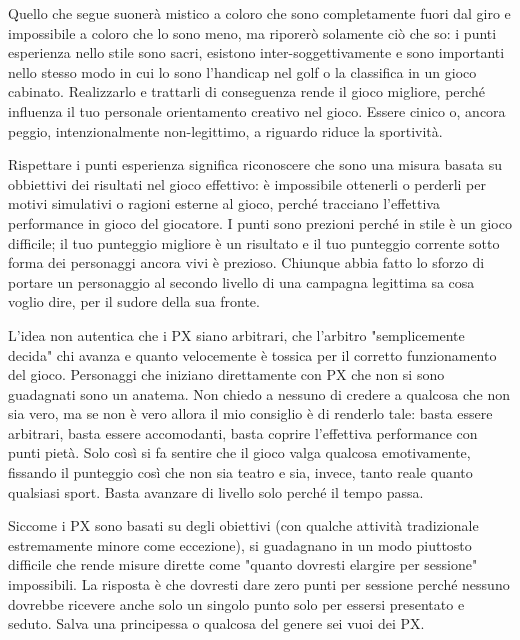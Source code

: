 
Quello che segue suonerà mistico a coloro che sono completamente fuori dal giro e impossibile a coloro che lo sono meno, ma riporerò solamente ciò che so: i punti esperienza nello stile  sono sacri, esistono inter-soggettivamente e sono importanti nello stesso modo in cui lo sono l'handicap nel golf o la classifica in un gioco cabinato. Realizzarlo e trattarli di conseguenza rende il gioco migliore, perché influenza il tuo personale orientamento creativo nel gioco. Essere cinico o, ancora peggio, intenzionalmente non-legittimo, a riguardo riduce la sportività.

Rispettare i punti esperienza significa riconoscere che sono una misura basata su obbiettivi dei risultati nel gioco effettivo: è impossibile ottenerli o perderli per motivi simulativi o ragioni esterne al gioco, perché tracciano l'effettiva performance in gioco del giocatore. I punti sono prezioni perché \dnd{} in stile  è un gioco difficile; il tuo punteggio migliore è un risultato e il tuo punteggio corrente sotto forma dei personaggi ancora vivi è prezioso. Chiunque abbia fatto lo sforzo di portare un personaggio al secondo livello di una campagna legittima sa cosa voglio dire, per il sudore della sua fronte.

L'idea non autentica che i PX siano arbitrari, che l'arbitro "semplicemente decida" chi avanza e quanto velocemente è tossica per il corretto funzionamento del gioco. Personaggi che iniziano direttamente con PX che non si sono guadagnati sono un anatema. Non chiedo a nessuno di credere a qualcosa che non sia vero, ma se non è vero allora il mio consiglio è di renderlo tale: basta essere arbitrari, basta essere accomodanti, basta coprire l'effettiva performance con punti pietà. Solo così si fa sentire che il gioco valga qualcosa emotivamente, fissando il punteggio così che non sia teatro e sia, invece, tanto reale quanto qualsiasi sport. Basta avanzare di livello solo perché il tempo passa.

Siccome i PX sono basati su degli obiettivi (con qualche attività tradizionale estremamente minore come eccezione), si guadagnano in un modo piuttosto difficile che rende misure dirette come "quanto dovresti elargire per sessione" impossibili. La risposta è che dovresti dare zero punti per sessione perché nessuno dovrebbe ricevere anche solo un singolo punto solo per essersi presentato e seduto. Salva una principessa o qualcosa del genere sei vuoi dei PX.

